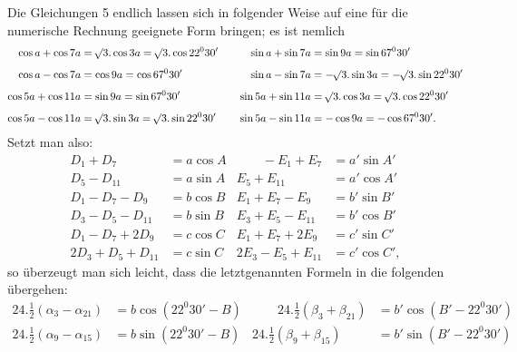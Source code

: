 \clearpage
\begin{landscape}
\begingroup
\fontsize{9.5}{12}\selectfont
{}
\renewcommand{\headrulewidth}{0pt}
\makeatletter\tagsleft@true\let\veqno\@@leqno\makeatother
\setlength{\lineskip}{4pt}\setlength{\lineskiplimit}{4pt}
\newcommand{\VthreeRaisedPoint}{\mathord{\text{\raisebox{.5ex}{.}}}}
\newcommand{\VthreeUpperMark}{\mathord{\text{\makebox[.15em][l]{\kern.25em\raisebox{1.7ex}{\rule{.11em}{.055ex}}}}}}
\newcommand{\VthreeFractionLowPoint}{\mathord{\text{\makebox[0pt][l]{\kern-.25em\raisebox{-.1ex}{\rule{.07em}{.05ex}}}}}}
\par\noindent\hspace*{\parindent}Die Gleichungen 5 endlich lassen sich in folgender Weise auf eine für die numerische Rechnung geeignete Form bringen; es ist nemlich
\[
\begin{aligned}
\cos a+\cos7a&=\BareRoot{3}\mathord{.}\cos3a=\BareRoot{3}\mathord{.}\cos22^0 30'&\qquad\sin a+\sin7a&=\sin9a=\sin67^0 30'\\[4pt]
\cos a-\cos7a&=\cos9a=\cos67^0 30'&\sin a-\sin7a&=-\BareRoot{3}\mathord{.}\sin3a=-\BareRoot{3}\mathord{.}\sin22^0 30'\\[4pt]
\cos5a+\cos11a&=\sin9a=\sin67^0 30'&\sin5a+\sin11a&=\BareRoot{3}\mathord{.}\cos3a=\BareRoot{3}\mathord{.}\cos22^0 30'\\[4pt]
\cos5a-\cos11a&=\BareRoot{3}\mathord{.}\sin3a=\BareRoot{3}\mathord{.}\sin22^0 30'&\sin5a-\sin11a&=-\cos9a=-\cos67^0 30'.
\end{aligned}
\]
Setzt man also:
\[
\begin{aligned}
D_1+D_7&=a\cos A&\qquad-E_1+E_7&=a'\sin A'\\
D_5-D_{11}&=a\sin A&E_5+E_{11}&=a'\cos A'\\[6pt]
D_1-D_7-D_9&=b\cos B&E_1+E_7-E_9&=b'\sin B'\\
D_3-D_5-D_{11}&=b\sin B&E_3+E_5-E_{11}&=b'\cos B'\\[6pt]
D_1-D_7+2D_9&=c\cos C&E_1+E_7+2E_9&=c'\sin C'\\
2D_3+D_5+D_{11}&=c\sin C&2E_3-E_5+E_{11}&=c'\cos C',
\end{aligned}
\]
so überzeugt man sich leicht, dass die letztgenannten Formeln in die folgenden übergehen:
\[
\tag*{V.}
\begin{aligned}
24\mathord{.}\tfrac12(\alpha_3-\alpha_{21})&=b\cos(22^0 30'-B)&\qquad24\mathord{.}\tfrac12(\beta_3+\beta_{21})&=b'\cos(B'-22^0 30')\\[4pt]
24\mathord{.}\tfrac12(\alpha_9-\alpha_{15})&=b\sin(22^0 30'-B)&24\mathord{.}\tfrac12(\beta_9+\beta_{15})&=b'\sin(B'-22^0 30')\\[6pt]

\end{aligned}\]
\end{landscape}

